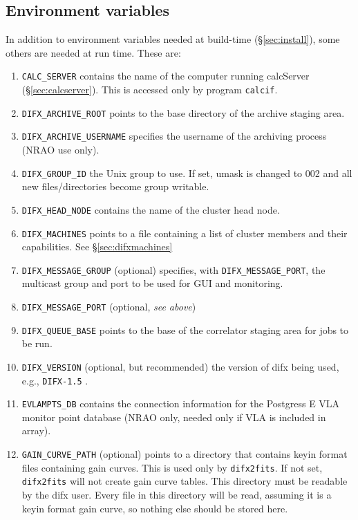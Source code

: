 \subsection{Environment variables} \label{sec:env}

In addition to environment variables needed at build-time (\S\ref{sec:install}), some others are needed at run time.
These are:
\begin{enumerate}
\item {\tt CALC\_SERVER} contains the name of the computer running calcServer (\S\ref{sec:calcserver}).
This is accessed only by program {\tt calcif}.
\item {\tt DIFX\_ARCHIVE\_ROOT} points to the base directory of the archive staging area.
\item {\tt DIFX\_ARCHIVE\_USERNAME} specifies the username of the archiving process (NRAO use only).
\item {\tt DIFX\_GROUP\_ID} the Unix group to use.  If set, umask is changed to 002 and all new files/directories become group writable. \difxoneone
\item {\tt DIFX\_HEAD\_NODE} contains the name of the cluster head node.
\item {\tt DIFX\_MACHINES} points to a file containing a list of cluster members and their capabilities.
See \S\ref{sec:difxmachines}
\item {\tt DIFX\_MESSAGE\_GROUP} (optional) specifies, with {\tt DIFX\_MESSAGE\_PORT}, the multicast group and port to be used for GUI and monitoring. \difxoneone
\item {\tt DIFX\_MESSAGE\_PORT} (optional, {\em see above}) \difxoneone
\item {\tt DIFX\_QUEUE\_BASE} points to the base of the correlator staging area for jobs to be run.  \difxonefive
\item {\tt DIFX\_VERSION} (optional, but recommended) the version of difx being used, e.g., {\tt DIFX-1.5} . \difxoneone
\item {\tt EVLAMPTS\_DB} contains the connection information for the Postgress E
VLA monitor point database (NRAO only, needed only if VLA is included in array).
\item {\tt GAIN\_CURVE\_PATH} (optional) points to a directory that contains keyin format files containing gain curves.
This is used only by {\tt difx2fits}.
If not set, {\tt difx2fits} will not create gain curve tables.
This directory must be readable by the difx user.
Every file in this directory will be read, assuming it is a keyin format gain curve, so nothing else should be stored here.

\end{enumerate}
